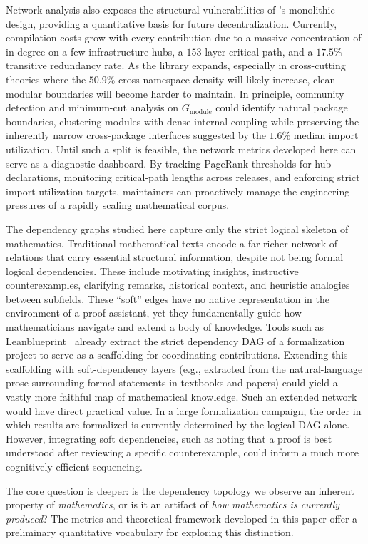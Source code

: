 Network analysis also exposes the structural vulnerabilities of 's monolithic design, providing a quantitative basis for future decentralization. Currently, compilation costs grow with every contribution due to a massive concentration of in-degree on a few infrastructure hubs, a $153$-layer critical path, and a $17.5\%$ transitive redundancy rate. As the library expands, especially in cross-cutting theories where the $50.9\%$ cross-namespace density will likely increase, clean modular boundaries will become harder to maintain. In principle, community detection and minimum-cut analysis on $G_{\mathrm{module}}$ could identify natural package boundaries, clustering modules with dense internal coupling while preserving the inherently narrow cross-package interfaces suggested by the $1.6\%$ median import utilization. Until such a split is feasible, the network metrics developed here can serve as a diagnostic dashboard. By tracking PageRank thresholds for hub declarations, monitoring critical-path lengths across releases, and enforcing strict import utilization targets, maintainers can proactively manage the engineering pressures of a rapidly scaling mathematical corpus.

The dependency graphs studied here capture only the strict logical skeleton of mathematics. Traditional mathematical texts encode a far richer network of relations that carry essential structural information, despite not being formal logical dependencies. These include motivating insights, instructive counterexamples, clarifying remarks, historical context, and heuristic analogies between subfields. These ``soft'' edges have no native representation in the environment of a proof assistant, yet they fundamentally guide how mathematicians navigate and extend a body of knowledge. Tools such as Leanblueprint~\cite{massot2020leanblueprint} already extract the strict dependency DAG of a formalization project to serve as a scaffolding for coordinating contributions. Extending this scaffolding with soft-dependency layers (e.g., extracted from the natural-language prose surrounding formal statements in textbooks and papers) could yield a vastly more faithful map of mathematical knowledge. Such an extended network would have direct practical value. In a large formalization campaign, the order in which results are formalized is currently determined by the logical DAG alone. However, integrating soft dependencies, such as noting that a proof is best understood after reviewing a specific counterexample, could inform a much more cognitively efficient sequencing.

The core question is deeper: is the dependency topology we observe an inherent property of \emph{mathematics}, or is it an artifact of \emph{how mathematics is currently produced}? The metrics and theoretical framework developed in this paper offer a preliminary quantitative vocabulary for exploring this distinction.